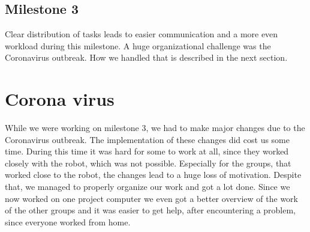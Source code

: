 \documentclass[main.tex]{subfiles}
\begin{document}
		\subsection{Milestone 3}
		Clear distribution of tasks leads to easier communication and a more even workload during this milestone.
		A huge organizational challenge was the Coronavirus outbreak. How we handled that is described in the next section. 
		
		\section{Corona virus}
	  	While we were working on milestone 3, we had to make major changes due to the Coronavirus outbreak. The implementation of these changes did cost us some time. During this time it was hard for some to work at all, since they worked closely with the robot, which was not possible.
	  	Especially for the groups, that worked close to the robot, the changes lead to a huge loss of motivation.
	  	Despite that, we managed to properly organize our work and got a lot done.
	  	Since we now worked on one project computer we even got a better overview of the work of the other groups and it was easier to get help, after encountering a problem, since everyone worked from home.

	\endgroup
\end{document}
